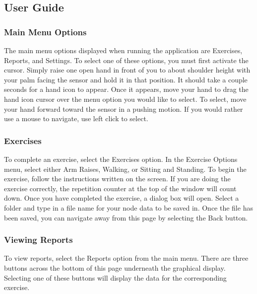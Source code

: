 \documentclass[onecolumn, draftclsnofoot,10pt, compsoc]{IEEEtran}
\begin{document}
\subsection{User Guide}
\subsubsection{Main Menu Options}
The main menu options displayed when running the application are Exercises, Reports, and Settings. To select one of these options, you must first activate the cursor. Simply raise one open hand in front of you to about shoulder height with your palm facing the sensor and hold it in that position. It should take a couple seconds for a hand icon to appear. Once it appears, move your hand to drag the hand icon cursor over the menu option you would like to select. To select, move your hand forward toward the sensor in a pushing motion. If you would rather use a mouse to navigate, use left click to select.
\subsubsection{Exercises}
To complete an exercise, select the Exercises option. In the Exercise Options menu, select either Arm Raises, Walking, or Sitting and Standing. To begin the exercise, follow the instructions written on the screen. If you are doing the exercise correctly, the repetition counter at the top of the window will count down. Once you have completed the exercise, a dialog box will open. Select a folder and type in a file name for your node data to be saved in. Once the file has been saved, you can navigate away from this page by selecting the Back button.
\subsubsection{Viewing Reports}
To view reports, select the Reports option from the main menu. There are three buttons across the bottom of this page underneath the graphical display. Selecting one of these buttons will display the data for the corresponding exercise.
\end{document}
